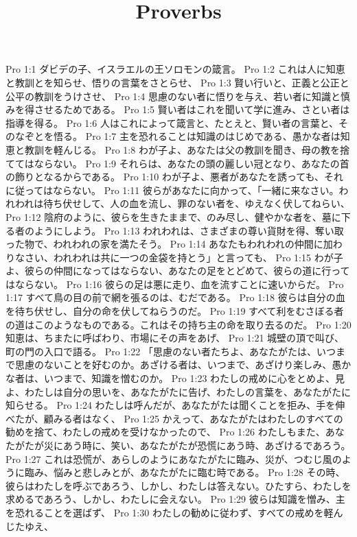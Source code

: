 

\title{Proverbs}

Pro 1:1  ダビデの子、イスラエルの王ソロモンの箴言。
Pro 1:2  これは人に知恵と教訓とを知らせ、悟りの言葉をさとらせ、
Pro 1:3  賢い行いと、正義と公正と公平の教訓をうけさせ、
Pro 1:4  思慮のない者に悟りを与え、若い者に知識と慎みを得させるためである。
Pro 1:5  賢い者はこれを聞いて学に進み、さとい者は指導を得る。
Pro 1:6  人はこれによって箴言と、たとえと、賢い者の言葉と、そのなぞとを悟る。
Pro 1:7  主を恐れることは知識のはじめである、愚かな者は知恵と教訓を軽んじる。
Pro 1:8  わが子よ、あなたは父の教訓を聞き、母の教を捨ててはならない。
Pro 1:9  それらは、あなたの頭の麗しい冠となり、あなたの首の飾りとなるからである。
Pro 1:10  わが子よ、悪者があなたを誘っても、それに従ってはならない。
Pro 1:11  彼らがあなたに向かって、「一緒に来なさい。われわれは待ち伏せして、人の血を流し、罪のない者を、ゆえなく伏してねらい、
Pro 1:12  陰府のように、彼らを生きたままで、のみ尽し、健やかな者を、墓に下る者のようにしよう。
Pro 1:13  われわれは、さまざまの尊い貨財を得、奪い取った物で、われわれの家を満たそう。
Pro 1:14  あなたもわれわれの仲間に加わりなさい、われわれは共に一つの金袋を持とう」と言っても、
Pro 1:15  わが子よ、彼らの仲間になってはならない、あなたの足をとどめて、彼らの道に行ってはならない。
Pro 1:16  彼らの足は悪に走り、血を流すことに速いからだ。
Pro 1:17  すべて鳥の目の前で網を張るのは、むだである。
Pro 1:18  彼らは自分の血を待ち伏せし、自分の命を伏してねらうのだ。
Pro 1:19  すべて利をむさぼる者の道はこのようなものである。これはその持ち主の命を取り去るのだ。
Pro 1:20  知恵は、ちまたに呼ばわり、市場にその声をあげ、
Pro 1:21  城壁の頂で叫び、町の門の入口で語る。
Pro 1:22  「思慮のない者たちよ、あなたがたは、いつまで思慮のないことを好むのか。あざける者は、いつまで、あざけり楽しみ、愚かな者は、いつまで、知識を憎むのか。
Pro 1:23  わたしの戒めに心をとめよ、見よ、わたしは自分の思いを、あなたがたに告げ、わたしの言葉を、あなたがたに知らせる。
Pro 1:24  わたしは呼んだが、あなたがたは聞くことを拒み、手を伸べたが、顧みる者はなく、
Pro 1:25  かえって、あなたがたはわたしのすべての勧めを捨て、わたしの戒めを受けなかったので、
Pro 1:26  わたしもまた、あなたがたが災にあう時に、笑い、あなたがたが恐慌にあう時、あざけるであろう。
Pro 1:27  これは恐慌が、あらしのようにあなたがたに臨み、災が、つむじ風のように臨み、悩みと悲しみとが、あなたがたに臨む時である。
Pro 1:28  その時、彼らはわたしを呼ぶであろう、しかし、わたしは答えない。ひたすら、わたしを求めるであろう、しかし、わたしに会えない。
Pro 1:29  彼らは知識を憎み、主を恐れることを選ばず、
Pro 1:30  わたしの勧めに従わず、すべての戒めを軽んじたゆえ、
